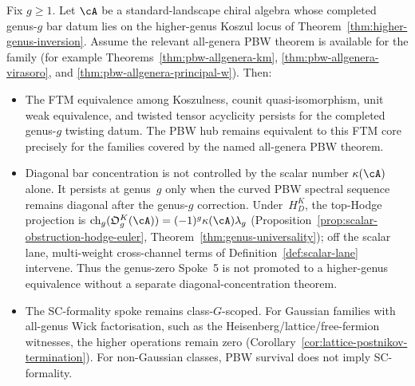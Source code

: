 \begin{corollary}
\label{cor:TFAE-extends-to-genus-1-uniform-weight}
Fix $g\geq 1$.  Let $\cA$ be a standard-landscape chiral algebra
whose completed genus-$g$ bar datum lies on the higher-genus Koszul
locus of Theorem~\ref{thm:higher-genus-inversion}.  Assume the
relevant all-genera PBW theorem is available for the family
\textup{(}for example
Theorems~\ref{thm:pbw-allgenera-km},
\ref{thm:pbw-allgenera-virasoro}, and
\ref{thm:pbw-allgenera-principal-w}\textup{)}.  Then:
\begin{itemize}
\item[\textup{(a)}] The FTM equivalence among Koszulness, counit
quasi-isomorphism, unit weak equivalence, and twisted tensor
acyclicity persists for the completed genus-$g$ twisting datum.  The
PBW hub remains equivalent to this FTM core precisely for the families
covered by the named all-genera PBW theorem.
\item[\textup{(b)}] Diagonal bar concentration is not controlled by
the scalar number $\kappa(\cA)$ alone.  It persists at genus~$g$ only
when the curved PBW spectral sequence remains diagonal after the
genus-$g$ correction.  Under~$H_D^K$, the top-Hodge projection is
$\operatorname{ch}_g(\mathfrak O_g^K(\cA))
=(-1)^g\kappa(\cA)\lambda_g$
\textup{(}Proposition~\ref{prop:scalar-obstruction-hodge-euler},
Theorem~\ref{thm:genus-universality}\textup{)}; off the scalar lane,
multi-weight cross-channel terms of
Definition~\ref{def:scalar-lane} intervene.  Thus the genus-zero
Spoke~5 is not promoted to a higher-genus equivalence without a
separate diagonal-concentration theorem.
\item[\textup{(c)}] The SC-formality spoke remains class-$G$-scoped.
For Gaussian families with all-genus Wick factorisation, such as the
Heisenberg/lattice/free-fermion witnesses, the higher operations
remain zero
\textup{(}Corollary~\ref{cor:lattice-postnikov-termination}\textup{)}.
For non-Gaussian classes, PBW survival does not imply
SC-formality.
\end{itemize}
\end{corollary}

